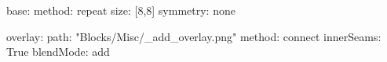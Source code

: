 base:
  method: repeat
  size: [8,8]
  symmetry: none

overlay:
  path: "Blocks/Misc/_add_overlay.png"
  method: connect
  innerSeams: True
blendMode: add
